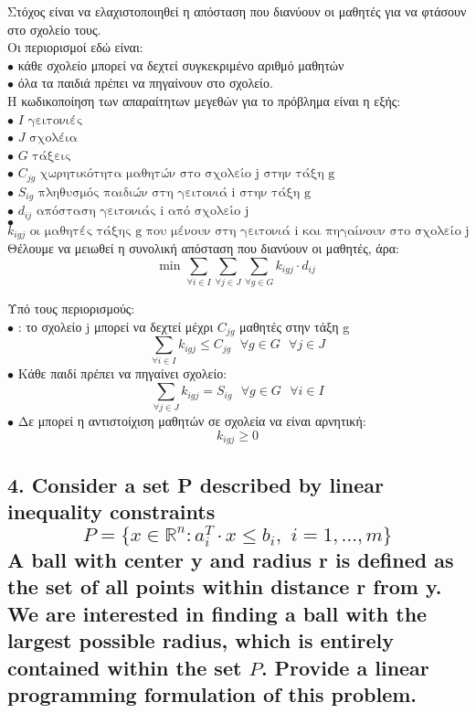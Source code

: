 \documentclass[12pt]{article}
\newcommand{\R}{\mathbb{R}}
\newcommand{\margin}{\hspace{4pt}}
\begin{document}
Στόχος είναι να ελαχιστοποιηθεί η απόσταση που διανύουν οι μαθητές για να φτάσουν στο σχολείο τους. \\

Οι περιορισμοί εδώ είναι: \\
\( \bullet \) κάθε σχολείο μπορεί να δεχτεί συγκεκριμένο αριθμό μαθητών \\
\( \bullet \) όλα τα παιδιά πρέπει να πηγαίνουν στο σχολείο. \\

Η κωδικοποίηση των απαραίτητων μεγεθών για το πρόβλημα είναι η εξής: \\
\( \bullet \) \( I \mbox{ γειτονιές}\) \\
\(\bullet \) \( J \mbox{ σχολέια}\) \\
\(\bullet \) \( G \mbox{ τάξεις}\) \\
\(\bullet \) \( C_{jg} \mbox{ χωρητικότητα μαθητών στο σχολείο j στην τάξη g}\) \\
\(\bullet \) \( S_{ig} \mbox{ πληθυσμός παιδιών στη γειτονιά i στην τάξη g}\) \\
\(\bullet \) \( d_{ij} \mbox{ απόσταση γειτονιάς i από σχολείο j}\) \\
\(\bullet \) \( k_{igj} \mbox{ οι μαθητές τάξης g που μένουν στη γειτονιά i και πηγαίνουν στο σχολείο j}\) \\

Θέλουμε να μειωθεί η συνολική απόσταση που διανύουν οι μαθητές, άρα: \\
\[ \mbox{min } \sum_{\forall i \in I}{ \sum_{\forall j \in J} { \sum_{\forall g \in G} {k_{igj} \cdot d_{ij} } }  }     \]

Υπό τους περιορισμούς: \\
\( \bullet \) : το σχολείο j μπορεί να δεχτεί μέχρι \( C_{jg} \) μαθητές στην τάξη g  \\
\[  \sum_{\forall i \in I}{ k_{igj} \leq C_{jg} } \mbox{ } \forall g \in G \mbox{ } \forall j \in J   \]
\( \bullet \) Κάθε παιδί πρέπει να πηγαίνει σχολείο: \\
\[  \sum_{\forall j \in J}{ k_{igj} = S_{ig} } \mbox{ } \forall g \in G \mbox{ } \forall i \in I   \]
\( \bullet \) Δε μπορεί η αντιστοίχιση μαθητών σε σχολεία να είναι αρνητική: \\
\[  k_{igj} \geq 0  \]

\vspace{2in}

\pagebreak

\subsection*{4. Consider a set P described by linear inequality constraints
\[ P = \{x \in \R^n : a^{T}_{i} \cdot x \leq b_i, \margin i = 1, \dotsc, m\} \]
A ball with center y and radius r is defined as the set of all points within distance r from y.
We are interested in finding a ball with the largest possible radius, which is entirely contained
within the set \( P \). Provide a linear programming formulation of this problem.}
\end{document}
